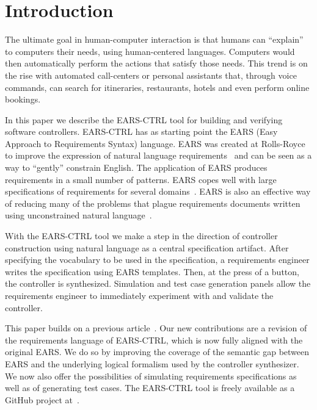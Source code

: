 \section{Introduction}
\vspace{-.2cm}The ultimate goal in human-computer interaction is that humans can
``explain'' to computers their needs, using human-centered languages. Computers
would then automatically perform the actions that satisfy those needs. This
trend is on the rise with automated call-centers or personal
assistants that, through voice commands, can search for itineraries,
restaurants, hotels and even perform online bookings.

In this paper we describe the \textsf{EARS-CTRL} tool for building and verifying
software controllers. \textsf{EARS-CTRL} has as starting point the EARS (Easy
Approach to Requirements Syntax) language. EARS was created at Rolls-Royce to
improve the expression of natural language requirements~\cite{EARS09} and can be
seen as a way to ``gently'' constrain English. The application of EARS produces
requirements in a small number of patterns. EARS copes well with large
specifications of requirements for several domains~\cite{EARS10,EARS16}. EARS is
also an effective way of reducing many of the problems that plague requirements
documents written using unconstrained natural language~\cite{EARS09}.

With the \textsf{EARS-CTRL} tool we make a step in the direction of controller
construction using natural language as a central specification artifact.
After specifying the vocabulary to be used in the specification, a requirements
engineer writes the specification using EARS templates. Then, at the press of a
button, the controller is synthesized. Simulation and test case
generation panels allow the requirements engineer to immediately
experiment with and validate the controller.

This paper builds on a previous article~\cite{LucioRCM17}.
Our new contributions are a revision of the requirements language of
\textsf{EARS-CTRL}, which is now fully aligned with the original EARS. We do so
by improving the coverage of the semantic gap between EARS and the underlying
logical formalism used by the controller synthesizer. We now also offer the
possibilities of simulating requirements specifications as well as of generating test cases.
The \textsf{EARS-CTRL} tool is freely available as a GitHub project
at~\cite{EARSProject}. \vspace{-.4cm}

% 

